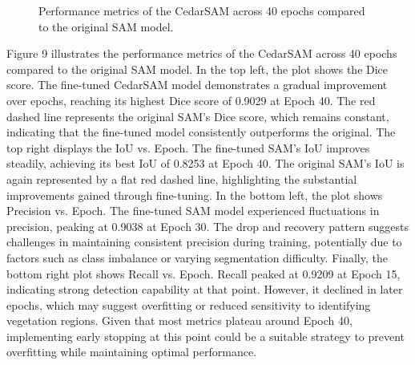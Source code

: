 \documentclass[letterpaper, 10 pt, conference]{ieeeconf}  %
\begin{document}
\begin{figure}[thpb]
  \centering
  \caption{Performance metrics of the CedarSAM across 40 epochs compared to the original SAM model.}
  \label{fig:score_distributions}
\end{figure}

Figure 9 illustrates the performance metrics of the CedarSAM across 40 epochs compared to the original SAM model. In the top left, the plot shows the Dice score. The fine-tuned CedarSAM model demonstrates a gradual improvement over epochs, reaching its highest Dice score of 0.9029 at Epoch 40. The red dashed line represents the original SAM's Dice score, which remains constant, indicating that the fine-tuned model consistently outperforms the original. The top right displays the IoU vs. Epoch. The fine-tuned SAM's IoU improves steadily, achieving its best IoU of 0.8253 at Epoch 40. The original SAM's IoU is again represented by a flat red dashed line, highlighting the substantial improvements gained through fine-tuning. In the bottom left, the plot shows Precision vs. Epoch. The fine-tuned SAM model experienced fluctuations in precision, peaking at 0.9038 at Epoch 30. The drop and recovery pattern suggests challenges in maintaining consistent precision during training, potentially due to factors such as class imbalance or varying segmentation difficulty. Finally, the bottom right plot shows Recall vs. Epoch. Recall peaked at 0.9209 at Epoch 15, indicating strong detection capability at that point. However, it declined in later epochs, which may suggest overfitting or reduced sensitivity to identifying vegetation regions. Given that most metrics plateau around Epoch 40, implementing early stopping at this point could be a suitable strategy to prevent overfitting while maintaining optimal performance.
\end{document}
